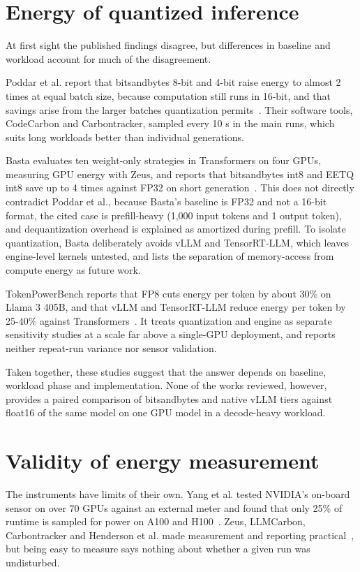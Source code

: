 \section{Energy of quantized inference}
At first sight the published findings disagree, but differences in baseline and workload account for much of the disagreement.

Poddar et al. report that bitsandbytes 8-bit and 4-bit raise energy to almost 2 times at equal batch size, because computation still runs in 16-bit, and that savings arise from the larger batches quantization permits~\cite{b6}. Their software tools, CodeCarbon and Carbontracker, sampled every 10 s in the main runs, which suits long workloads better than individual generations.

Basta evaluates ten weight-only strategies in Transformers on four GPUs, measuring GPU energy with Zeus, and reports that bitsandbytes int8 and EETQ int8 save up to 4 times against FP32 on short generation~\cite{b47}. This does not directly contradict Poddar et al., because Basta's baseline is FP32 and not a 16-bit format, the cited case is prefill-heavy (1,000 input tokens and 1 output token), and dequantization overhead is explained as amortized during prefill. To isolate quantization, Basta deliberately avoids vLLM and TensorRT-LLM, which leaves engine-level kernels untested, and lists the separation of memory-access from compute energy as future work.

TokenPowerBench reports that FP8 cuts energy per token by about 30\% on Llama 3 405B, and that vLLM and TensorRT-LLM reduce energy per token by 25-40\% against Transformers~\cite{b7}. It treats quantization and engine as separate sensitivity studies at a scale far above a single-GPU deployment, and reports neither repeat-run variance nor sensor validation.

Taken together, these studies suggest that the answer depends on baseline, workload phase and implementation. None of the works reviewed, however, provides a paired comparison of bitsandbytes and native vLLM tiers against float16 of the same model on one GPU model in a decode-heavy workload.

\section{Validity of energy measurement}
The instruments have limits of their own. Yang et al. tested NVIDIA's on-board sensor on over 70 GPUs against an external meter and found that only 25\% of runtime is sampled for power on A100 and H100~\cite{b17}. Zeus, LLMCarbon, Carbontracker and Henderson et al. made measurement and reporting practical~\cite{b13,b14,b15,b16}, but being easy to measure says nothing about whether a given run was undisturbed.

